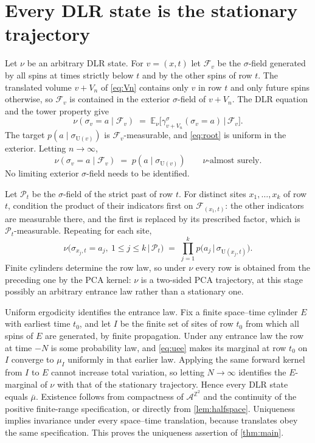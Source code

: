 \documentclass[11pt]{article}
\theoremstyle{plain}
\theoremstyle{definition}
\theoremstyle{remark}
\newcommand{\A}{\mathcal{A}}
\newcommand{\Z}{\mathbb{Z}}
\newcommand{\E}{\mathbb{E}}
\newcommand{\ba}{\bar{\mu}}
\newcommand{\Ue}{\mathrm{U}}
\begin{document}
\section{Every DLR state is the stationary trajectory}
\label{sec:dlr}

Let $\nu$ be an arbitrary DLR state. For $v=(x,t)$ let $\mathcal F_v$ be the $\sigma$-field generated by all spins at times strictly below $t$ and by the other spins of row $t$. The translated volume $v+V_n$ of \eqref{eq:Vn} contains only $v$ in row $t$ and only future spins otherwise, so $\mathcal F_v$ is contained in the exterior $\sigma$-field of $v+V_n$. The DLR equation and the tower property give
\[
\nu(\sigma_v=a\mid\mathcal F_v)\;=\;\E_\nu\bigl[\gamma^\sigma_{v+V_n}(\sigma_v=a)\,\big|\,\mathcal F_v\bigr].
\]
The target $p(a\mid\sigma_{\Ue(v)})$ is $\mathcal F_v$-measurable, and \eqref{eq:root} is uniform in the exterior. Letting $n\to\infty$,
\begin{equation}
\nu(\sigma_v=a\mid\mathcal F_v)\;=\;p(a\mid\sigma_{\Ue(v)})\qquad\nu\text{-almost surely}.
\label{eq:onesite}
\end{equation}
No limiting exterior $\sigma$-field needs to be identified.

Let $\mathcal P_t$ be the $\sigma$-field of the strict past of row $t$. For distinct sites $x_1,\dots,x_k$ of row $t$, condition the product of their indicators first on $\mathcal F_{(x_1,t)}$: the other indicators are measurable there, and the first is replaced by its prescribed factor, which is $\mathcal P_t$-measurable. Repeating for each site,
\begin{equation}
\nu\bigl(\sigma_{x_j,t}=a_j,\ 1\le j\le k\,\big|\,\mathcal P_t\bigr)\;=\;\prod_{j=1}^kp\bigl(a_j\,\big|\,\sigma_{\Ue(x_j,t)}\bigr).
\label{eq:row}
\end{equation}
Finite cylinders determine the row law, so under $\nu$ every row is obtained from the preceding one by the PCA kernel: $\nu$ is a two-sided PCA trajectory, at this stage possibly an arbitrary entrance law rather than a stationary one.

Uniform ergodicity identifies the entrance law. Fix a finite space--time cylinder $E$ with earliest time $t_0$, and let $I$ be the finite set of sites of row $t_0$ from which all spins of $E$ are generated, by finite propagation. Under any entrance law the row at time $-N$ is some probability law, and \eqref{eq:uee} makes its marginal at row $t_0$ on $I$ converge to $\mu_I$ uniformly in that earlier law. Applying the same forward kernel from $I$ to $E$ cannot increase total variation, so letting $N\to\infty$ identifies the $E$-marginal of $\nu$ with that of the stationary trajectory. Hence every DLR state equals $\ba$. Existence follows from compactness of $\A^{\Z^2}$ and the continuity of the positive finite-range specification, or directly from \cref{lem:halfspace}. Uniqueness implies invariance under every space--time translation, because translates obey the same specification. This proves the uniqueness assertion of \cref{thm:main}.
\end{document}
